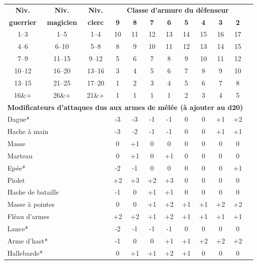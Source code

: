 \begin{tabular}{cccccccccccc}
\textbf{Niv. } & \textbf{Niv.} & \textbf{Niv.} & \multicolumn{8}{c}{\textbf{Classe d'armure du défenseur}} \\
\textbf{guerrier}   & \textbf{magicien}   & \textbf{clerc}   & \textbf{9} & \textbf{8} & \textbf{7} & \textbf{6} & \textbf{5} & \textbf{4} & \textbf{3} & \textbf{2} \\
1--3   & 1--5   & 1--4   & 10 & 11 & 12 & 13 & 14 & 15 & 16 & 17 \\
4--6   & 6--10  & 5--8   &  8 &  9 & 10 & 11 & 12 & 13 & 14 & 15 \\
7--9   & 11--15 & 9--12  &  5 &  6 &  7 &  8 &  9 & 10 & 11 & 12 \\
10--12 & 16--20 & 13--16 &  3 &  4 &  5 &  6 &  7 &  8 &  9 & 10 \\
13--15 & 21--25 & 17--20 &  1 &  2 &  3 &  4 &  5 &  6 &  7 &  8 \\
16\&+  & 26\&+  & 21\&+  &  1 &  1 &  1 &  1 &  2 &  3 &  4 &  5 \\
\multicolumn{11}{l}{\textbf{Modificateurs d'attaques dus aux armes de mêlée (à ajouter au d20)}} \\
\multicolumn{3}{l}{Dague*}            & -3 & -3 & -1 & -1 &  0 &  0 & +1 & +2 \\
\multicolumn{3}{l}{Hache à main}      & -3 & -2 & -1 & -1 &  0 &  0 & +1 & +1 \\
\multicolumn{3}{l}{Masse}             &  0 & +1 &  0 &  0 &  0 &  0 &  0 &  0 \\
\multicolumn{3}{l}{Marteau}           &  0 & +1 &  0 & +1 &  0 &  0 &  0 &  0 \\
\multicolumn{3}{l}{Epée*}             & -2 & -1 &  0 &  0 &  0 &  0 &  0 & +1 \\
\multicolumn{3}{l}{Piolet}            & +2 & +3 & +2 & +3 &  0 &  0 &  0 &  0 \\
\multicolumn{3}{l}{Hache de bataille} & -1 &  0 & +1 & +1 &  0 &  0 &  0 &  0 \\
\multicolumn{3}{l}{Masse à pointes}   &  0 &  0 & +1 & +2 & +1 & +1 & +2 & +2 \\
\multicolumn{3}{l}{Fléau d'armes}     & +2 & +2 & +1 & +2 & +1 & +1 & +1 & +1 \\
\multicolumn{3}{l}{Lance*}            & -2 & -1 & -1 & -1 &  0 &  0 &  0 &  0 \\
\multicolumn{3}{l}{Arme d'hast*}      & -1 &  0 &  0 & +1 & +1 & +2 & +2 & +2 \\
\multicolumn{3}{l}{Hallebarde*}       &  0 & +1 & +1 & +2 & +1 &  0 &  0 &  0 \\

\end{tabular}

